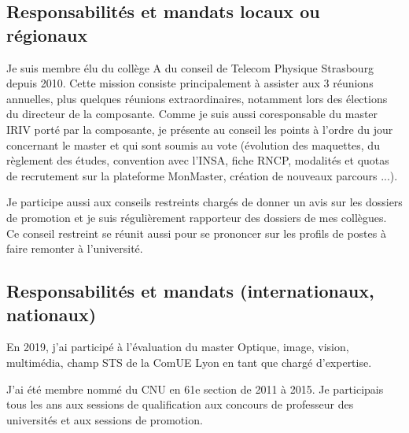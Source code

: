 \documentclass[a4paper,12pt]{article}
\begin{document}
\subsection{Responsabilités et mandats locaux ou régionaux}

Je suis membre élu du collège A du conseil de Telecom Physique Strasbourg depuis 2010. Cette mission consiste principalement à assister aux 3 réunions annuelles, plus quelques réunions extraordinaires, notamment lors des élections du directeur de la composante. Comme je suis aussi coresponsable du master IRIV porté par la composante, je présente au conseil les points à l'ordre du jour concernant le master et qui sont soumis au vote (évolution des maquettes, du règlement des études, convention avec l'INSA, fiche RNCP, modalités et quotas de recrutement sur la plateforme MonMaster, création de nouveaux parcours ...).

Je participe aussi aux conseils restreints chargés de donner un avis sur les dossiers de promotion et je suis régulièrement rapporteur des dossiers de mes collègues. Ce conseil restreint se réunit aussi pour se prononcer sur les profils de postes à faire remonter à l'université.

\subsection{Responsabilités et mandats (internationaux, nationaux)}

En 2019, j'ai participé à l'évaluation du master Optique, image, vision, multimédia, champ STS de la ComUE Lyon en tant que chargé d'expertise.

J'ai été membre nommé du CNU en 61e section de 2011 à 2015. Je participais tous les ans aux sessions de qualification aux concours de professeur des universités et aux sessions de promotion.
\end{document}

